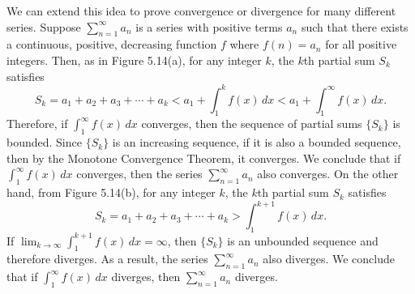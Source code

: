 \documentclass{report}
\begin{document}
    \bigbreak \noindent 
    We can extend this idea to prove convergence or divergence for many different series. Suppose $\sum_{n=1}^{\infty} a_n$ is a series with positive terms $a_n$ such that there exists a continuous, positive, decreasing function $f$ where $f(n) = a_n$ for all positive integers. Then, as in Figure 5.14(a), for any integer $k$, the $k$th partial sum $S_k$ satisfies
    \[
    S_k = a_1 + a_2 + a_3 + \cdots + a_k < a_1 + \int_{1}^{k} f(x) \, dx < a_1 + \int_{1}^{\infty} f(x) \, dx.
    \]
    Therefore, if $\int_{1}^{\infty} f(x) \, dx$ converges, then the sequence of partial sums $\{S_k\}$ is bounded. Since $\{S_k\}$ is an increasing sequence, if it is also a bounded sequence, then by the Monotone Convergence Theorem, it converges. We conclude that if $\int_{1}^{\infty} f(x) \, dx$ converges, then the series $\sum_{n=1}^{\infty} a_n$ also converges. On the other hand, from Figure 5.14(b), for any integer $k$, the $k$th partial sum $S_k$ satisfies
    \[
    S_k = a_1 + a_2 + a_3 + \cdots + a_k > \int_{1}^{k+1} f(x) \, dx.
    \]
    If $\lim_{k \to \infty} \int_{1}^{k+1} f(x) \, dx = \infty$, then $\{S_k\}$ is an unbounded sequence and therefore diverges. As a result, the series $\sum_{n=1}^{\infty} a_n$ also diverges. We conclude that if $\int_{1}^{\infty} f(x) \, dx$ diverges, then $\sum_{n=1}^{\infty} a_n$ diverges.
    \bigbreak \noindent 
\end{document}
